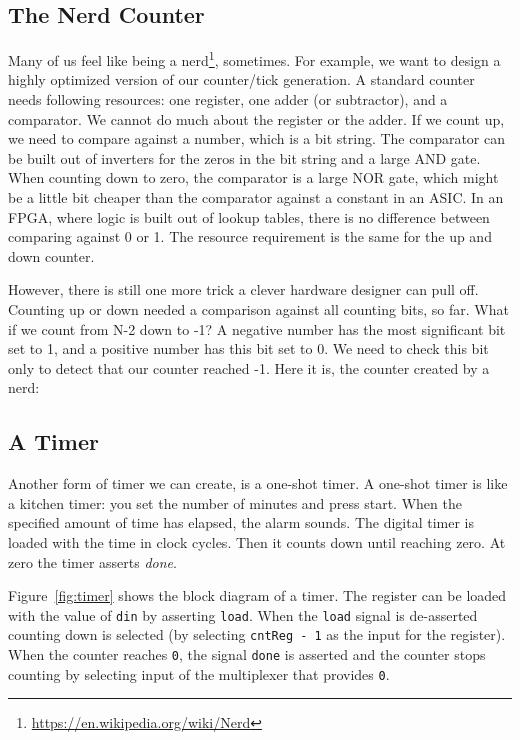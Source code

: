 \documentclass[%
    10pt,
    headinclude, footexclude,
    openright, %
    notitlepage,
    cleardoubleempty,
    headsepline,
    pointlessnumbers,
    bibtotoc, idxtotoc,
    ]{scrbook}
\newcommand{\code}[1]{{\small{\texttt{#1}}}}
\newcommand{\myref}[2]{\href{#1}{#2}}
\renewcommand{\myref}[2]{{#2}{\footnote{\url{#1}}}}
\begin{document}
\subsection{The Nerd Counter}

Many of us feel like being a \myref{https://en.wikipedia.org/wiki/Nerd}{nerd}, sometimes.
For example, we want to design a highly optimized version of our counter/tick generation.
A standard counter needs following resources: one register, one adder (or subtractor),
and a comparator. We cannot do much about the register or the adder. If we count
up, we need to compare against a number, which is a bit string. The comparator
can be built out of inverters for the zeros in the bit string and a large AND gate.
When counting down to zero, the comparator is a large NOR gate, which might be
a little bit cheaper than the comparator against a constant in an ASIC.
In an FPGA, where logic is built out of lookup tables, there is no difference between comparing
against 0 or 1. The resource requirement is the same for the up and down counter.

However, there is still one more trick a clever hardware designer can pull off.
Counting up or down needed a comparison against all counting bits, so far.
What if we count from N-2 down to -1? A negative number has the most significant bit
set to 1, and a positive number has this bit set to 0. We need to check this bit only to detect
that our counter reached -1. Here it is, the counter created by a nerd:



\subsection{A Timer}

Another form of timer we can create, is a one-shot timer. A one-shot timer is like a
kitchen timer: you set the number of minutes and press start. When the specified amount
of time has elapsed, the alarm sounds.
The digital timer is loaded with the time in clock cycles.
Then it counts down until reaching zero. At zero the timer asserts \emph{done}.

Figure~\ref{fig:timer} shows the block diagram of a timer. The register can be loaded with
the value of \code{din} by asserting \code{load}. When the \code{load} signal is de-asserted
counting down is selected (by selecting \code{cntReg - 1} as the input for the register).
When the counter reaches \code{0}, the signal \code{done} is asserted and the counter stops
counting by selecting input of the multiplexer that provides \code{0}.
\end{document}
